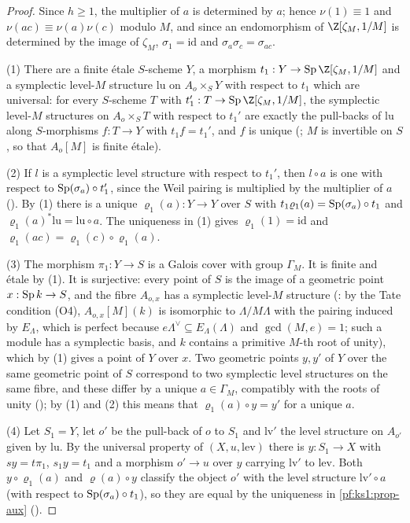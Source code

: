 \begin{proof}
Since $h\ge1$, the multiplier of $a$ is determined by $a$; hence $\nu(1)\equiv1$ and $\nu(ac)\equiv\nu(a)\nu(c)$ modulo $M$, and since an
endomorphism of $\Z[\zeta_M,1/M]$ is determined by the image of $\zeta_M$, $\sigma_1=\mathrm{id}$ and $\sigma_a\sigma_c=\sigma_{ac}$.

(1) There are a finite \'etale $S$-scheme $Y$, a morphism $t_1:Y\to\ksoneSp\Z[\zeta_M,1/M]$ and a symplectic level-$M$ structure $\mathrm{lu}$ on
$A_o\times_SY$ with respect to $t_1$ which are universal: for every $S$-scheme $T$ with $t_1':T\to\ksoneSp\Z[\zeta_M,1/M]$, the symplectic
level-$M$ structures on $A_o\times_ST$ with respect to $t_1'$ are exactly the pull-backs of $\mathrm{lu}$ along $S$-morphisms $f:T\to Y$ with
$t_1f=t_1'$, and $f$ is unique (; $M$ is invertible on $S$, so that $A_o[M]$
is finite \'etale).

(2) If $l$ is a symplectic level structure with respect to $t_1'$, then $l\circ a$ is one with respect to $\operatorname{Sp}(\sigma_a)\circ t_1'$, since the
Weil pairing is multiplied by the multiplier of $a$ (). By (1) there is a unique
$\varrho_1(a):Y\to Y$ over $S$ with $t_1\varrho_1(a)=\operatorname{Sp}(\sigma_a)\circ t_1$ and $\varrho_1(a)^*\mathrm{lu}=\mathrm{lu}\circ a$. The uniqueness in (1)
gives $\varrho_1(1)=\mathrm{id}$ and $\varrho_1(ac)=\varrho_1(c)\circ\varrho_1(a)$.

(3) The morphism $\pi_1:Y\to S$ is a Galois cover with group $\Gamma_M$. It is finite and \'etale by (1). It is surjective: every point of $S$ is the
image of a geometric point $x:\operatorname{Sp} k\to S$, and the fibre $A_{o,x}$ has a symplectic level-$M$ structure
(: by the Tate condition (O4), $A_{o,x}[M](k)$ is isomorphic to
$\Lambda/M\Lambda$ with the pairing induced by $E_\Lambda$, which is perfect because $e\Lambda^\vee\subseteq E_\Lambda(\Lambda)$ and $\gcd(M,e)=1$;
such a module has a symplectic basis, and $k$ contains a primitive $M$-th root of unity), which by (1) gives a point of $Y$ over $x$. Two
geometric points $y,y'$ of $Y$ over the same geometric point of $S$ correspond to two symplectic level structures on the same fibre, and these
differ by a unique $a\in\Gamma_M$, compatibly with the roots of unity
(); by (1) and (2) this means that $\varrho_1(a)\circ y=y'$ for a unique
$a$.

(4) Let $S_1=Y$, let $o'$ be the pull-back of $o$ to $S_1$ and $\mathrm{lv}'$ the level structure on $A_{o'}$ given by $\mathrm{lu}$. By the universal
property of $(X,u,\mathrm{lev})$ there is $y:S_1\to X$ with $sy=t\pi_1$, $s_1y=t_1$ and a morphism $o'\to u$ over $y$ carrying $\mathrm{lv}'$ to
$\mathrm{lev}$. Both $y\circ\varrho_1(a)$ and $\varrho(a)\circ y$ classify the object $o'$ with the level structure $\mathrm{lv}'\circ a$ (with respect
to $\operatorname{Sp}(\sigma_a)\circ t_1$), so they are equal by the uniqueness in \cref{pf:ks1:prop-aux}
().
\end{proof}


